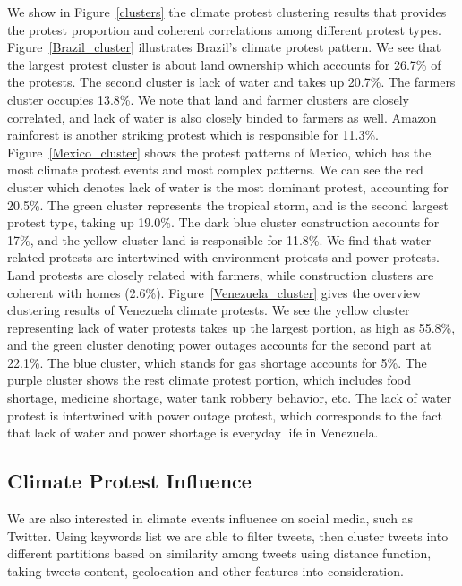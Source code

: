 We show in Figure~\ref{clusters} the climate protest clustering results that provides the protest proportion and coherent correlations among different protest types. Figure~\ref{Brazil_cluster} illustrates Brazil's climate protest pattern.
We see that the largest protest cluster is about land ownership which accounts for 26.7\% of the protests.
The second cluster is lack of water and takes up 20.7\%.
The farmers cluster occupies 13.8\%.
We note that land and farmer clusters are closely correlated, and lack of water is also closely binded to farmers as well. Amazon rainforest is another striking protest which is responsible for 11.3\%. Figure~\ref{Mexico_cluster} shows the protest patterns of Mexico, which has the most climate protest events and most complex patterns. We can see the red cluster which denotes lack of water is the most dominant protest, accounting for 20.5\%.
The green cluster represents the tropical storm, and is the second largest protest type, taking up 19.0\%.
The dark blue cluster construction accounts for 17\%, and the yellow cluster land is responsible for 11.8\%. We find that water related protests are intertwined with environment protests and power protests.
Land protests are closely related with farmers, while construction clusters are coherent with homes (2.6\%). Figure~\ref{Venezuela_cluster} gives the overview clustering results of Venezuela climate protests. We see the yellow cluster representing lack of water protests takes up the largest portion, as high as 55.8\%, and the green cluster denoting power outages accounts for the second part at 22.1\%. The blue cluster, which stands for gas shortage accounts for 5\%. The purple cluster shows the rest climate protest portion, which includes food shortage, medicine shortage, water tank robbery behavior, etc. The lack of water protest is intertwined with power outage protest, which corresponds to the fact that lack of water and power shortage is everyday life in Venezuela.

\subsection{Climate Protest Influence}
We are also interested in climate events influence on social media, such as Twitter. Using keywords list we are able to filter tweets, then cluster tweets into different partitions based on similarity among tweets using distance function, taking tweets content, geolocation and other features into consideration.

